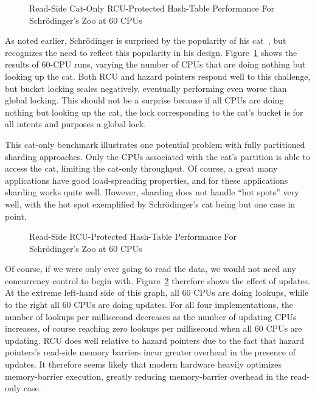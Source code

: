 \begin{figure}[tb]
\centering
{}
\caption{Read-Side Cat-Only RCU-Protected Hash-Table Performance For Schr\"odinger's Zoo at 60 CPUs}
\label{fig:datastruct:Read-Side Cat-Only RCU-Protected Hash-Table Performance For Schroedinger's Zoo at 60 CPUs}
\end{figure}

As noted earlier, Schr\"odinger is surprised by the popularity of his
cat~\cite{ErwinSchroedinger1935Cat}, but recognizes the need to reflect
this popularity in his design.
Figure~\ref{fig:datastruct:Read-Side Cat-Only RCU-Protected Hash-Table Performance For Schroedinger's Zoo at 60 CPUs}
shows the results of 60-CPU runs, varying the number of CPUs that are
doing nothing but looking up the cat.
Both RCU and hazard pointers respond well to this challenge, but
bucket locking scales negatively, eventually performing even worse
than global locking.
This should not be a surprise because if all CPUs are doing nothing
but looking up the cat, the lock corresponding to the cat's bucket
is for all intents and purposes a global lock.

This cat-only benchmark illustrates one potential problem with
fully partitioned sharding approaches.
Only the CPUs associated with the cat's
partition is able to access the cat, limiting the cat-only
throughput.
Of course, a great many applications have good load-spreading
properties, and for these applications sharding works
quite well.
However, sharding does not handle ``hot spots'' very well, with
the hot spot exemplified by Schr\"odinger's cat being but one case
in point.

\begin{figure}[tb]
\centering
{}
\caption{Read-Side RCU-Protected Hash-Table Performance For Schr\"odinger's Zoo at 60 CPUs}
\label{fig:datastruct:Read-Side RCU-Protected Hash-Table Performance For Schroedinger's Zoo at 60 CPUs}
\end{figure}

Of course, if we were only ever going to read the data, we would not need
any concurrency control to begin with.
Figure~\ref{fig:datastruct:Read-Side RCU-Protected Hash-Table Performance For Schroedinger's Zoo at 60 CPUs}
therefore shows the effect of updates.
At the extreme left-hand side of this graph, all 60 CPUs are doing lookups,
while to the right all 60 CPUs are doing updates.
For all four implementations, the number of lookups per millisecond
decreases as the number of updating CPUs increases, of course reaching
zero lookups per millisecond when all 60 CPUs are updating.
RCU does well relative to hazard pointers due to the fact that hazard
pointers's read-side memory barriers incur greater overhead in the
presence of updates.
It therefore seems likely that modern hardware heavily optimizes memory-barrier
execution, greatly reducing memory-barrier overhead in the read-only case.

